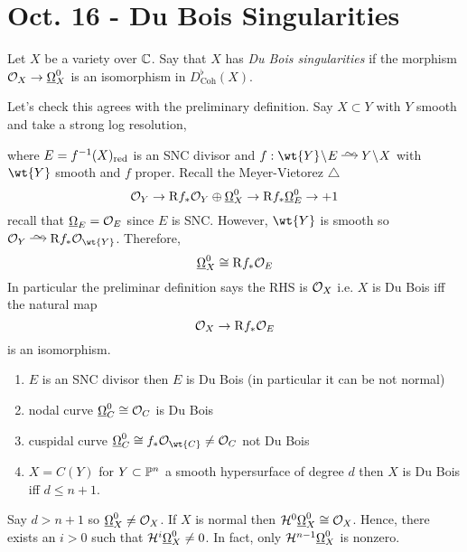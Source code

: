 \documentclass[12pt]{article}
\newcommand{\R}{\mathrm{R}}
\renewcommand{\cH}{\mathcal{H}}
\begin{document}
\section{Oct. 16 - Du Bois Singularities}

\renewcommand{\Coh}{\mathrm{Coh}}

\begin{defn}
Let $X$ be a variety over $\CC$. Say that $X$ has \textit{Du Bois singularities} if the morphism $\struct{X} \to \ul{\Omega}_X^0$ is an isomorphism in $D^\flat_{\Coh}(X)$.
\end{defn}

Let's check this agrees with the preliminary definition. Say $X \subset Y$ with $Y$ smooth and take a strong log resolution,
\begin{center}
\end{center}
where $E = f^{-1}(X)_{\red}$ is an SNC divisor and $f : \wt{Y} \sm E \iso Y \sm X$ with $\wt{Y}$ smooth and $f$ proper. Recall the Meyer-Vietorez $\triangle$
\[ \struct{Y} \to \R f_* \struct{Y} \oplus \ul{\Omega}_X^0 \to \R f_* \ul{\Omega}_E^0 \to + 1 \]
recall that $\ul{\Omega}_E = \struct{E}$ since $E$ is SNC. However, $\wt{Y}$ is smooth so $\struct{Y} \iso \R f_* \struct{\wt{Y}}$. Therefore, 
\[ \ul{\Omega}_X^0 \cong \R f_* \struct{E} \]
In particular the preliminar definition says the RHS is $\struct{X}$ i.e. $X$ is Du Bois iff the natural map
\[ \struct{X} \to \R f_* \struct{E} \]
is an isomorphism. 

\begin{example}
\begin{enumerate}
\item $E$ is an SNC divisor then $E$ is Du Bois (in particular it can be not normal)
\item nodal curve $\ul{\Omega}_C^0 \cong \struct{C}$ is Du Bois
\item cuspidal curve $\ul{\Omega}_C^0 \cong f_* \struct{\wt{C}} \neq \struct{C}$ not Du Bois
\item $X = C(Y)$ for $Y \subset \P^n$ a smooth hypersurface of degree $d$ then $X$ is Du Bois iff $d \le n + 1$. 
\end{enumerate}
\end{example}

\begin{rmk}
Say $d > n+1$ so $\ul{\Omega}_X^0 \neq \struct{X}$. If $X$ is normal then $\cH^0 \ul{\Omega}_X^0 \cong \struct{X}$. Hence, there exists an $i > 0$ such that $\cH^i \ul{\Omega}_X^0 \neq 0$. In fact, only $\cH^{n-1} \ul{\Omega}_X^0$ is nonzero. 
\end{rmk}
\end{document}
